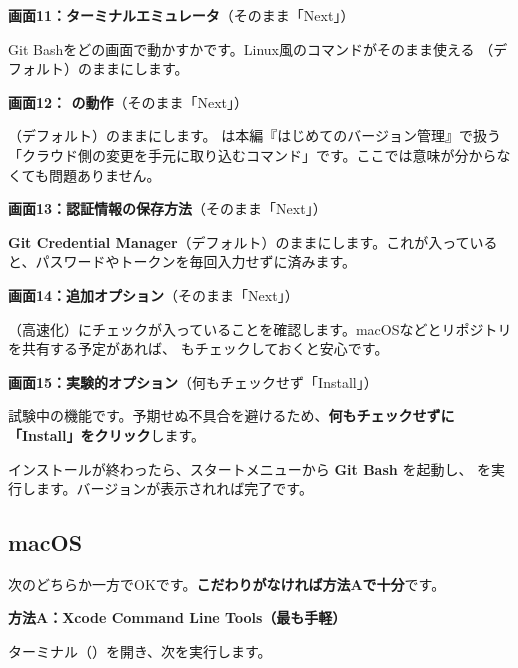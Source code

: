 \medskip
\noindent\textbf{画面11：ターミナルエミュレータ}（そのまま「Next」）

Git Bashをどの画面で動かすかです。Linux風のコマンドがそのまま使える \textbf{}（デフォルト）のままにします。

\medskip
\noindent\textbf{画面12： の動作}（そのまま「Next」）

（デフォルト）のままにします。 は本編『はじめてのバージョン管理』で扱う「クラウド側の変更を手元に取り込むコマンド」です。ここでは意味が分からなくても問題ありません。

\medskip
\noindent\textbf{画面13：認証情報の保存方法}（そのまま「Next」）

\textbf{Git Credential Manager}（デフォルト）のままにします。これが入っていると、パスワードやトークンを毎回入力せずに済みます。

\medskip
\noindent\textbf{画面14：追加オプション}（そのまま「Next」）

（高速化）にチェックが入っていることを確認します。macOSなどとリポジトリを共有する予定があれば、 もチェックしておくと安心です。

\medskip
\noindent\textbf{画面15：実験的オプション}（何もチェックせず「Install」）

試験中の機能です。予期せぬ不具合を避けるため、\textbf{何もチェックせずに「Install」をクリック}します。

インストールが終わったら、スタートメニューから \textbf{Git Bash} を起動し、 を実行します。バージョンが表示されれば完了です。

\subsection{macOS}
\label{sec:install-mac}

次のどちらか一方でOKです。\textbf{こだわりがなければ方法Aで十分}です。

\noindent\textbf{方法A：Xcode Command Line Tools（最も手軽）}

ターミナル（）を開き、次を実行します。

